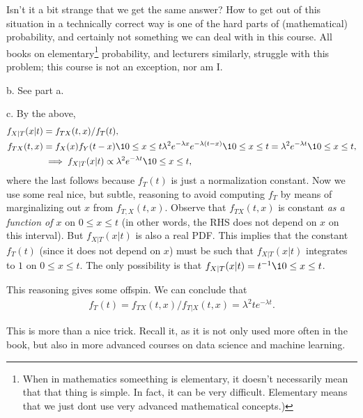 \begin{exercise}
\begin{solution}
Isn't it a bit strange that we get the same answer?
How to get out of this situation in a technically correct way is one of the hard parts of (mathematical) probability, and certainly not something we can deal with  in this course.
All books on elementary\footnote{When  in mathematics someething is elementary, it doesn't necessarily mean that that thing is simple. In fact, it can be very difficult.  Elementary means that we just dont use very advanced mathematical concepts.)} probability, and lecturers similarly, struggle with this problem; this course is not an exception, nor am I.

b.  See  part a.

c. By the above,
\begin{align*}
  f_{X|T}(x|t) &= f_{TX}(t,x)/f_T(t), \\
f_{TX}(t,x)  &=  f_X(x)f_Y(t-x) \1{0\leq x \leq t} \lambda^2 e^{-\lambda x} e^{-\lambda(t-x)} \1{0\leq x\leq t} = \lambda^2e^{-\lambda t} \1{0\leq x\leq t},\\
  &\implies  f_{X|T}(x|t) \propto \lambda^2e^{-\lambda t} \1{0\leq x\leq t} ,
\end{align*}
where the last follows because $f_T(t)$ is just a normalization constant.
Now we use some real nice, but subtle, reasoning to avoid computing $f_T$ by means of marginalizing out $x$ from $f_{T,X}(t, x)$.  Observe that $f_{TX}(t, x)$ is constant \emph{as a function of $x$} on $0\leq x \leq t$ (in other words, the RHS does not depend on $x$ on this interval). But $f_{X|T}(x|t)$  is also a real PDF. This implies  that the constant $f_T(t)$ (since it does not depend on $x$) must be  such that  $f_{X|T}(x|t)$ integrates to $1$ on $0\leq x \leq t$. The only possibility is that $f_{X|T}(x|t) = t^{-1}\1{0\leq x \leq t}$.

This reasoning gives some  offspin.  We can conclude that
\begin{align*}
  f_T(t) = f_{TX}(t, x)/f_{T|X}(t,x) = \lambda^2 t e^{-\lambda t}.
\end{align*}

This is more than a nice trick. Recall it, as it is not only used more often in the book, but also in more advanced courses on data science and machine learning.
\end{solution}
\end{exercise}


